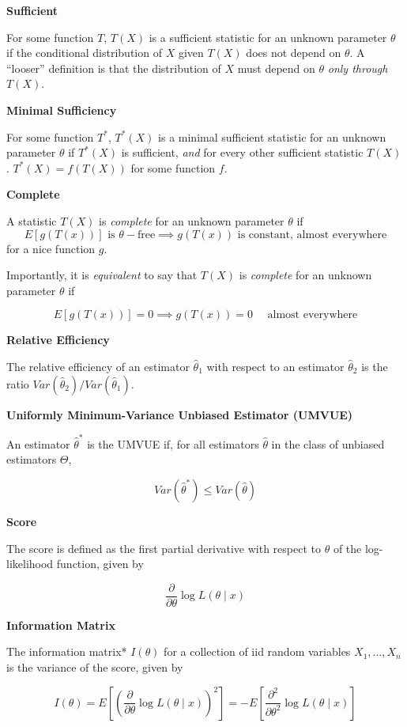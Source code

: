 \documentclass[
  letterpaper,
  DIV=11,
  numbers=noendperiod]{scrreprt}
\begin{document}
\textbf{Sufficient}

For some function \(T\), \(T(X)\) is a sufficient statistic for an
unknown parameter \(\theta\) if the conditional distribution of \(X\)
given \(T(X)\) does not depend on \(\theta\). A ``looser'' definition is
that the distribution of \(X\) must depend on \(\theta\) \emph{only
through} \(T(X)\).

\textbf{Minimal Sufficiency}

For some function \(T^*\), \(T^*(X)\) is a minimal sufficient statistic
for an unknown parameter \(\theta\) if \(T^*(X)\) is sufficient,
\emph{and} for every other sufficient statistic \(T(X)\).
\(T^*(X) = f(T(X))\) for some function \(f\).

\textbf{Complete}

A statistic \(T(X)\) is \emph{complete} for an unknown parameter
\(\theta\) if \[
E[g(T(x))] \text{ is } \theta-\text{free} \implies g(T(x)) \text{ is constant, almost everywhere}
\] for a nice function \(g\).

Importantly, it is \emph{equivalent} to say that \(T(X)\) is
\emph{complete} for an unknown parameter \(\theta\) if

\[
E[g(T(x))] = 0 \implies g(T(x)) = 0 \quad\text{ almost everywhere}
\]

\textbf{Relative Efficiency}

The relative efficiency of an estimator \(\hat{\theta}_1\) with respect
to an estimator \(\hat{\theta}_2\) is the ratio
\(Var(\hat{\theta}_2)/Var(\hat{\theta}_1)\).

\textbf{Uniformly Minimum-Variance Unbiased Estimator (UMVUE)}

An estimator \(\hat{\theta}^*\) is the UMVUE if, for all estimators
\(\hat{\theta}\) in the class of unbiased estimators \(\Theta\),

\[
Var(\hat{\theta}^*) \leq Var(\hat{\theta})
\]

\textbf{Score}

The score is defined as the first partial derivative with respect to
\(\theta\) of the log-likelihood function, given by

\[
\frac{\partial}{\partial \theta} \log L(\theta \mid x)
\]

\textbf{Information Matrix}

The information matrix* \(I(\theta)\) for a collection of iid random
variables \(X_1, \dots, X_n\) is the variance of the score, given by

\[
I(\theta) = E \left[ \left( \frac{\partial}{\partial \theta} \log L(\theta \mid x) \right)^2\right] = -E\left[ \frac{\partial^2}{\partial \theta^2} \log L(\theta \mid x)\right]
\]
\end{document}
